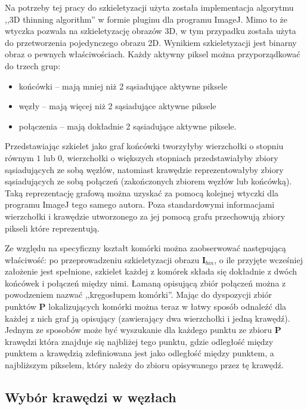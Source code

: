\documentclass[declaration,shortabstract,mgr]{iithesis}
\newcommand{\image}{\mathbf{I}}
\begin{document}
Na potrzeby tej pracy do szkieletyzacji użyta została implementacja algorytmu ,,3D thinning algorithm''\cite{algo:3d-thinning} w formie pluginu dla programu ImageJ\cite{plugin:skeletonize-3d}.
Mimo to że wtyczka pozwala na szkieletyzację obrazów 3D, w tym przypadku została użyta do przetworzenia pojedynczego obrazu 2D.
Wynikiem szkieletyzacji jest binarny obraz o pewnych właściwościach.
Każdy aktywny piksel można przyporządkować do trzech grup:
\begin{itemize}
  \item końcówki -- mają mniej niż 2 sąsiadujące aktywne piksele
  \item węzły -- mają więcej niż 2 sąsiadujące aktywne piksele
  \item połączenia -- mają dokładnie 2 sąsiadujące aktywne piksele.
\end{itemize}
Przedstawiając szkielet jako graf końcówki tworzyłyby wierzchołki o stopniu równym $1$ lub $0$, wierzchołki o większych stopniach przedstawiałyby zbiory sąsiadujących ze sobą węzłów, natomiast krawędzie reprezentowałyby zbiory sąsiadujących ze sobą połączeń (zakończonych zbiorem węzłów lub końcówką). Taką reprezentację grafową można uzyskać za pomocą kolejnej wtyczki dla programu ImageJ tego samego autora\cite{plugin:analyze-skeleton}. Poza standardowymi informacjami wierzchołki i krawędzie utworzonego za jej pomocą grafu przechowują zbiory pikseli które reprezentują.

Ze względu na specyficzny kształt komórki można zaobserwować następującą właściwość: po przeprowadzeniu szkieletyzacji obrazu $\image_{bin}$, o ile przyjęte wcześniej założenie jest spełnione, szkielet każdej z komórek składa się dokładnie z dwóch końcówek i połączeń między nimi. Łamaną opisującą zbiór połączeń można z powodzeniem nazwać ,,kręgosłupem komórki''. Mając do dyspozycji zbiór punktów $\mathbf{P}$ lokalizujących komórki można teraz w łatwy sposób odnaleźć dla każdej z nich graf ją opisujący (zawierający dwa wierzchołki i jedną krawędź). Jednym ze sposobów może być wyszukanie dla każdego punktu ze zbioru $\mathbf{P}$ krawędzi która znajduje się najbliżej tego punktu, gdzie odległość między punktem a krawędzią zdefiniowana jest jako odległość między punktem, a najbliższym pikselem, który należy do zbioru opisywanego przez tę krawędź.

\subsection{Wybór krawędzi w węzłach}
\label{sec:spine-extending}
\end{document}
